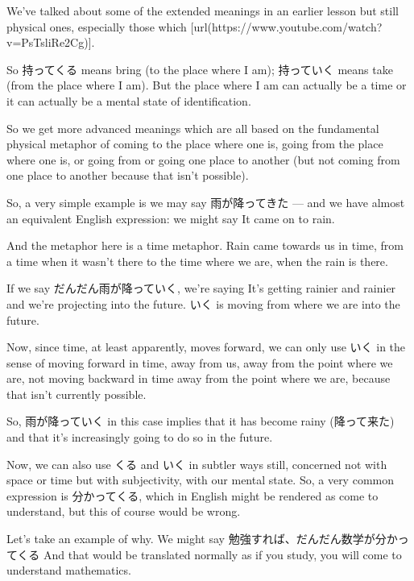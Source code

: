 We've talked about some of the extended meanings in an earlier lesson but still physical ones, especially those which [url(https://www.youtube.com/watch?v=PsTsliRe2Cg)].

So 持ってくる means bring (to the place where I am); 持っていく means take (from the place where I am). But the place where I am can actually be a time or it can actually be a mental state of identification.

{}

So we get more advanced meanings which are all based on the fundamental physical metaphor of coming to the place where one is, going from the place where one is, or going from or going one place to another (but not coming from one place to another because that isn't possible).

So, a very simple example is we may say 雨が降ってきた --- and we have almost an equivalent English expression: we might say It came on to rain.

{}

And the metaphor here is a time metaphor. Rain came towards us in time, from a time when it wasn't there to the time where we are, when the rain is there.

{}

If we say だんだん雨が降っていく, we're saying It's getting rainier and rainier and we're projecting into the future. いく is moving from where we are into the future.

Now, since time, at least apparently, moves forward, we can only use いく in the sense of moving forward in time, away from us, away from the point where we are, not moving backward in time away from the point where we are, because that isn't currently possible.

So, 雨が降っていく in this case implies that it has become rainy (降って来た) and that it's increasingly going to do so in the future.

Now, we can also use くる and いく in subtler ways still, concerned not with space or time but with subjectivity, with our mental state. So, a very common expression is 分かってくる, which in English might be rendered as come to understand, but this of course would be wrong. {}

Let's take an example of why. We might say 勉強すれば、だんだん数学が分かってくる And that would be translated normally as if you study, you will come to understand mathematics.

